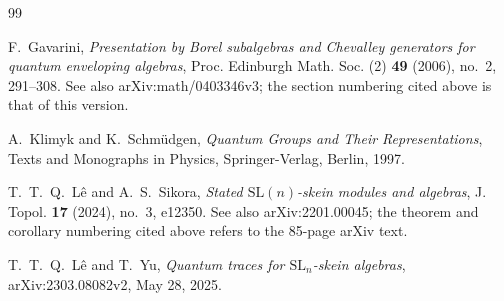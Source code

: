 \documentclass[11pt]{article}
\theoremstyle{remark}
\begin{document}
\begin{thebibliography}{99}

F.~Gavarini,
\emph{Presentation by Borel subalgebras and Chevalley generators
for quantum enveloping algebras},
Proc. Edinburgh Math. Soc. (2) \textbf{49} (2006), no.~2,
291--308.
See also arXiv:math/0403346v3; the section numbering cited above
is that of this version.

A.~Klimyk and K.~Schm\"udgen,
\emph{Quantum Groups and Their Representations},
Texts and Monographs in Physics,
Springer-Verlag, Berlin, 1997.

T.~T.~Q.~L\^e and A.~S.~Sikora,
\emph{Stated $\mathrm{SL}(n)$-skein modules and algebras},
J. Topol. \textbf{17} (2024), no.~3, e12350.
See also arXiv:2201.00045; the theorem and corollary numbering
cited above refers to the 85-page arXiv text.

T.~T.~Q.~L\^e and T.~Yu,
\emph{Quantum traces for $\mathrm{SL}_n$-skein algebras},
arXiv:2303.08082v2, May 28, 2025.

\end{thebibliography}
\end{document}
